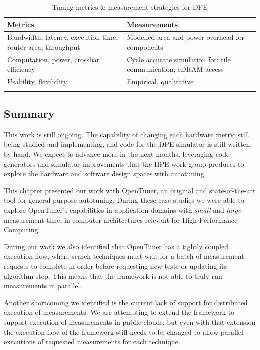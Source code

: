 \begin{table}[htpb]
\centering
\begin{tabular}{@{}p{}p{}@{}}
\toprule
\textbf{Metrics} & \textbf{Measurements} \\ \midrule
Bandwidth, latency, execution time, router area, throughput & Modelled area and power overhead for components \\
\addlinespace
Computation, power, crossbar efficiency & Cycle accurate simulation for: tile communication; eDRAM access \\
\addlinespace
Usability, flexibility & Empirical, qualitative \\ \bottomrule
\addlinespace
\end{tabular}
\caption{Tuning metrics \& measurement strategies for DPE}
\label{tab:metrics-measurements}
\end{table}


\subsection{Summary}
\label{subsec:DPEconcl}

This work is still ongoing. The capability of changing each hardware metric
still being studied and implementing, and code for the DPE simulator is still
written by hand. We expect to advance more in the next months, leveraging code
generators and simulator improvements that the HPE work group produces to
explore the hardware and software design spaces with autotuning.

This chapter presented our work with OpenTuner, an original and
state-of-the-art tool for general-purpose autotuning. During these case studies
we were able to explore OpenTuner's capabilities in application domains
with \textit{small} and \textit{large} measurement time, in computer
architectures relevant for High-Performance Computing.

During our work we also identified that OpenTuner has a tightly coupled
execution flow, where search techniques must wait for a batch of measurement
requests to complete in order before requesting new tests or updating its
algorithm step. This means that the framework is not able to truly run
measurements in parallel.

Another shortcoming we identified is the current lack of support for
distributed execution of measurements. We are attempting to extend the
framework to support execution of measurements in public clouds, but even with
that extension the execution flow of the framework still needs to be changed to
allow parallel executions of requested measurements for each technique.

